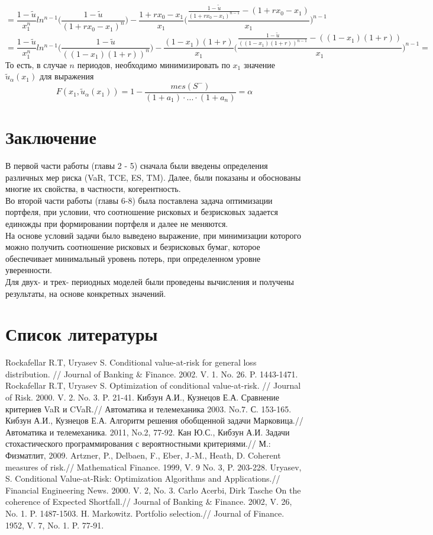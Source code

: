 \documentclass[18pt,a4paper]{article}
\theoremstyle{plain}
\theoremstyle{definition}
\begin{document}
$$
= \frac{1-\tilde{u}}{x_1^n} ln^{n-1}\Bigg(\frac{1-\tilde{u}}{(1+rx_0-x_1)^n}\Bigg)-\frac{1+rx_0-x_1}{x_1}\Bigg(\frac{\frac{1-\tilde{u}}{(1+rx_0- x_1)^{n-1}} - (1 + rx_0-x_1)}{x_1}\Bigg)^{n-1}
$$
$$
= \frac{1-\tilde{u}}{x_1^n} ln^{n-1}\Bigg(\frac{1-\tilde{u}}{((1-x_1)(1+r))^n}\Bigg)-\frac{(1-x_1)(1+r)}{x_1}\Bigg(\frac{\frac{1-\tilde{u}}{((1-x_1)(1+r))^{n-1}} - ((1-x_1)(1+r))}{x_1}\Bigg)^{n-1} =
$$
То есть, в случае $n$ периодов, необходимо минимизировать по $x_1$ значение $\tilde{u}_\alpha(x_1)$ для выражения
$$
F(x_1,\tilde{u}_\alpha(x_1))=1-\frac{mes(S^-)}{(1+a_1)\cdot ... \cdot(1+a_n)} = \alpha
$$
\newpage
\centering\section{Заключение}
\flushleft
В первой части работы (главы 2 - 5) сначала были введены определения различных мер риска (VaR, TCE, ES, TM). Далее, были показаны и обоснованы многие их свойства, в частности, когерентность.\\
Во второй части работы (главы 6-8) была поставлена задача оптимизации портфеля, при условии, что соотношение рисковых и безрисковых задается единожды при формировании портфеля и далее не меняются.\\
На основе условий задачи было выведено выражение, при минимизации которого можно получить соотношение рисковых и безрисковых бумаг, которое обеспечивает минимальный уровень потерь,
при определенном уровне уверенности.\\
Для двух- и трех- периодных моделей были проведены вычисления и получены результаты, на основе конкретных значений.


\newpage
\centering\section{Список литературы}
\begin{thebibliography}{1}
 Rockafellar R.T, Uryasev S. Conditional value-at-risk for general loss distribution. \newblock // Journal of Banking $\&$ Finance. 2002. V. 1. No. 26. P. 1443-1471.
 Rockafellar R.T, Uryasev S. Optimization of conditional value-at-risk. \newblock // Journal of Risk. 2000. V. 2. No. 3. P. 21-41.
 Кибзун А.И., Кузнецов Е.А. Сравнение критериев VaR и CVaR.\newblock // Автоматика и телемеханика 2003. No.7. С. 153-165.
 Кибзун А.И., Кузнецов Е.А. Алгоритм решения обобщенной задачи Марковица.\newblock //  Автоматика и телемеханика. 2011, No.2, 77-92.
 Кан Ю.С., Кибзун А.И. Задачи стохастического программирования с вероятностными критериями.\newblock // М.: Физматлит, 2009.
 Artzner, P., Delbaen, F., Eber, J.-M., Heath, D. Coherent measures of risk.\newblock // Mathematical Finance. 1999, V. 9 No. 3, P. 203-228.
 Uryasev, S. Conditional Value-at-Risk: Optimization Algorithms and Applications.\newblock // Financial Engineering News. 2000. V. 2, No. 3.
 Carlo Acerbi, Dirk Tasche On the coherence of Expected Shortfall.\newblock // Journal of Banking $\&$ Finance. 2002, V. 26, No. 1. P. 1487-1503.
  H. Markowitz.  Portfolio selection.\newblock // Journal of Finance. 1952, V. 7, No. 1. P. 77-91.
\end{thebibliography}
\end{document}
